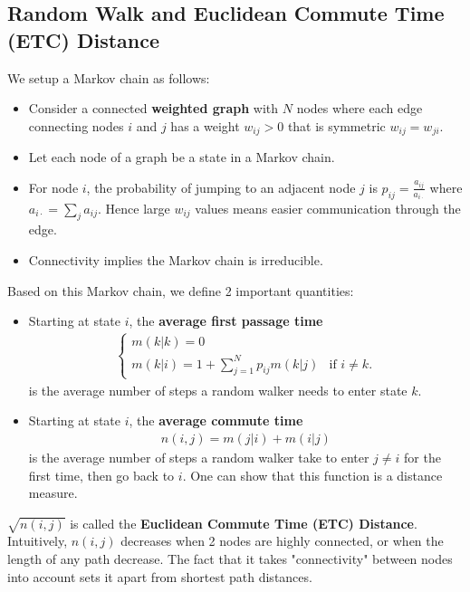 \documentclass[./some_latex_template.tex]{subfiles}
\begin{document}
\subsection{Random Walk and Euclidean Commute Time (ETC) Distance}

We setup a Markov chain as follows:
\begin{itemize}
	\item Consider a connected \textbf{weighted graph} with $N$ nodes where each edge connecting nodes $i$ and $j$ has a weight $w_{ij} > 0$ that is symmetric $w_{ij} = w_{ji}$. 
	\item Let each node of a graph be a state in a Markov chain. 
	\item For node $i$, the probability of jumping to an adjacent node $j$ is $p_{ij} = \frac{a_{ij}}{a_{i\cdot}}$ where $a_{i\cdot} = \sum_{j} a_{ij}.$ Hence large $w_{ij}$ values means easier communication through the edge. 
	\item Connectivity implies the Markov chain is irreducible. 
\end{itemize}

\noindent Based on this Markov chain, we define 2 important quantities: 

\begin{itemize}
	\item Starting at state $i$, the \textbf{average first passage time} \begin{align}\label{eq:m}		
		\begin{cases}
			m(k|k) = 0 \\
			m(k|i) = 1 + \sum_{j=1}^N p_{ij}m(k|j) & \text{if } i\neq k.
		\end{cases}
	\end{align}
	is the average number of steps a random walker needs to enter state $k$.
	\item Starting at state $i$, the \textbf{average commute time} 
	\begin{align*}
		n(i,j) = m(j|i) + m(i|j)
	\end{align*}
	is the average number of steps a random walker take to enter $j \neq i$ for the first time, then go back to $i$. One can show that this function is a distance measure. 
\end{itemize}

\noindent $\sqrt{n(i, j)}$ is called the \textbf{Euclidean Commute Time (ETC) Distance}. Intuitively, $n(i, j)$ decreases when 2 nodes are highly connected, or when the length of any path decrease. The fact that it takes "connectivity" between nodes into account sets it apart from  shortest path distances.
\end{document}
